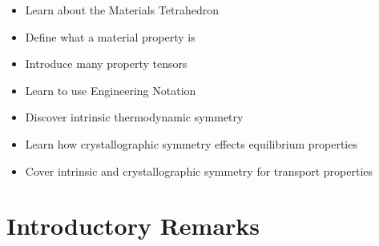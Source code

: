\begin{learningobjectives}
{\begin{itemize}
    \item[{\color{OCBurntOrange}\ref{\chabbr:sec:intro}:}] Learn about the Materials Tetrahedron
    \item[{\color{OCBurntOrange}\ref{\chabbr:sec:matprop}:}] Define what a material property is
    \item[{\color{OCBurntOrange}\ref{\chabbr:sec:proptensor}:}] Introduce many property tensors
    \item[{\color{OCBurntOrange}\ref{\chabbr:ssec:engnot}:}] Learn to use Engineering Notation\\
    \item[{\color{OCBurntOrange}\ref{\chabbr:sec:thermosym}:}] Discover intrinsic thermodynamic symmetry
    \item[{\color{OCBurntOrange}\ref{\chabbr:sec:CrySymK}:}] Learn how crystallographic symmetry effects equilibrium properties
    \item[{\color{OCBurntOrange}\ref{\chabbr:sec:CrySymL}:}] Cover intrinsic and crystallographic symmetry for transport properties
\end{itemize}}
\end{learningobjectives}


%
%
%




\section{Introductory Remarks}\label{\chabbr:sec:intro}

